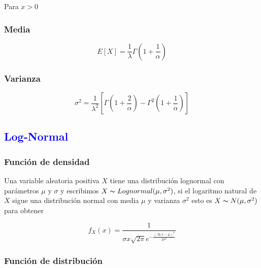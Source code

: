 \documentclass{article}
\begin{document}
\begin{multicols}{2}
                Para $x>0$

            \subsubsection{Media}

                \begin{equation*}
                    E[X] = \frac{1}{\lambda} \Gamma \left( 1+\frac{1}{\alpha} \right)
                \end{equation*}
                
            \subsubsection{Varianza}

                \begin{equation*}
                    \sigma ^2 = \frac{1}{\lambda ^2} \left[ \Gamma \left( 1+\frac{2}{\alpha} \right) -\Gamma ^2 \left( 1+\frac{1}{\alpha} \right) \right]
                \end{equation*}

                
        \subsection{\textcolor{blue}{Log-Normal}}

            \subsubsection{Función de densidad}

                Una variable aleatoria positiva $X$ tiene una distribución lognormal con parámetros $\mu$  y $\sigma$ y escribimos $X\thicksim Lognormal (\mu, \sigma ^2)$, si el logaritmo natural de $X$ sigue una distribución normal con media $\mu$  y varianza $ \sigma ^2$ esto es  $X\thicksim N (\mu, \sigma ^2)$ para obtener

                    \begin{equation*}
                        f_X (x) = \frac{1}{\sigma x\sqrt{2\pi}e^{-\frac{(\ln x-\mu)^2}{2\sigma ^2}}}
                    \end{equation*}

            \subsubsection{Función de distribución}


\end{multicols}
\end{document}
